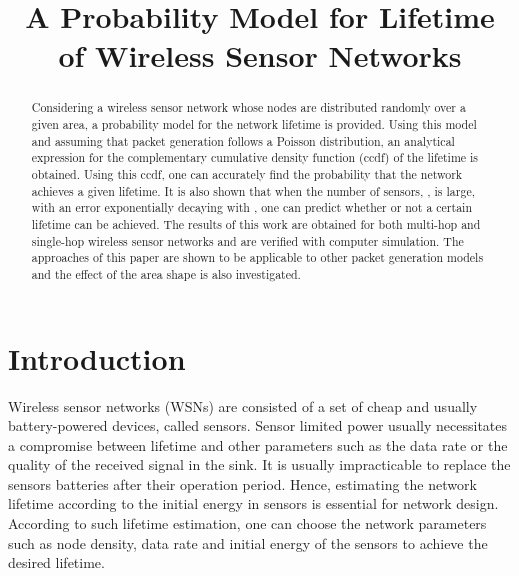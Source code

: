 \documentclass[conference]{IEEEtran}
\begin{document}
\title{A Probability Model for Lifetime of Wireless Sensor Networks}

\author{ }

\maketitle
\begin{abstract}
Considering a wireless sensor network whose nodes are distributed
randomly over a given area, a probability model for the network
lifetime is provided. Using this model and assuming that packet
generation follows a Poisson distribution, an analytical expression
for the complementary cumulative density function (ccdf) of the
lifetime is obtained. Using this ccdf, one can accurately find the
probability that the network achieves a given lifetime. It is also
shown that when the number of sensors, , is large, with an error
exponentially decaying with , one can predict whether or not a
certain lifetime can be achieved. The results of this work are
obtained for both multi-hop and single-hop wireless sensor networks
and are verified with computer simulation. The approaches of this
paper are shown to be applicable to other packet generation models
and the effect of the area shape is also investigated.
\end{abstract}

\section{Introduction} \label{Section Introduction}
Wireless sensor networks (WSNs) are consisted of a set of cheap and
usually battery-powered devices, called sensors. Sensor limited
power usually necessitates a compromise between lifetime and other
parameters such as the data rate or the quality of the received
signal in the sink. It is usually impracticable to replace the
sensors batteries after their operation period. Hence, estimating
the network lifetime according to the initial energy in sensors is
essential for network design. According to such lifetime estimation,
one can choose the network parameters such as node density, data
rate and initial energy of the sensors to achieve the desired
lifetime.
\end{document}
